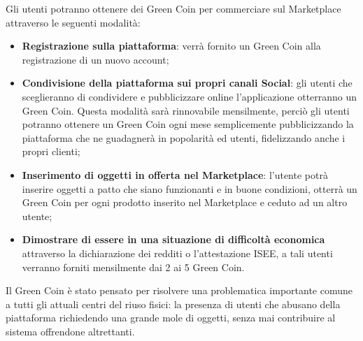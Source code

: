 Gli utenti potranno ottenere dei Green Coin per commerciare sul Marketplace attraverso le seguenti modalità:
\begin{itemize}
    \item \textbf{Registrazione sulla piattaforma}: verrà fornito un Green Coin alla registrazione di un nuovo account;
    \item \textbf{Condivisione della piattaforma sui propri canali Social}: gli utenti che sceglieranno di condividere e pubblicizzare online l'applicazione otterranno un Green Coin. Questa modalità sarà rinnovabile mensilmente, perciò gli utenti potranno ottenere un Green Coin ogni mese semplicemente pubblicizzando la piattaforma che ne guadagnerà in popolarità ed utenti, fidelizzando anche i propri clienti; 
    \item \textbf{Inserimento di oggetti in offerta nel Marketplace}: l'utente potrà inserire oggetti a patto che siano funzionanti e in buone condizioni, otterrà un Green Coin per ogni prodotto inserito nel Marketplace e ceduto ad un altro utente;
    \item \textbf{Dimostrare di essere in una situazione di difficoltà economica} attraverso la dichiarazione dei redditi o l'attestazione ISEE, a tali utenti verranno forniti mensilmente dai 2 ai 5 Green Coin.
\end{itemize}
Il Green Coin è stato pensato per risolvere una problematica importante comune a tutti gli attuali centri del riuso fisici: la presenza di utenti che abusano della piattaforma richiedendo una grande mole di oggetti, senza mai contribuire al sistema offrendone altrettanti. 
\medskip

